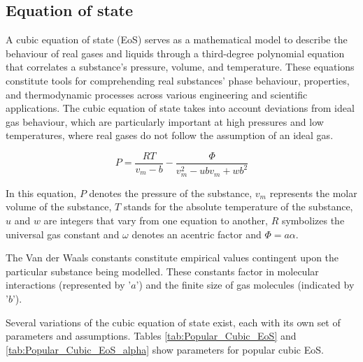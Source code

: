\documentclass[../Article_Model_Parameters.tex]{subfiles}
\begin{document}
	
	\label{CH: Thermodynamic_details}
	
	\subsection{Equation of state} \label{subsubsec: Equation of state}
	
	A cubic equation of state (EoS) serves as a mathematical model to describe the behaviour of real gases and liquids through a third-degree polynomial equation that correlates a substance's pressure, volume, and temperature. These equations constitute tools for comprehending real substances' phase behaviour, properties, and thermodynamic processes across various engineering and scientific applications. The cubic equation of state takes into account deviations from ideal gas behaviour, which are particularly important at high pressures and low temperatures, where real gases do not follow the assumption of an ideal gas.
	
	{\footnotesize
		\begin{equation}
			P = \frac{RT}{v_m-b} - \frac{\Phi}{v_m^2 - ubv_m + wb^2}
		\end{equation}
	}
	
	In this equation, $P$ denotes the pressure of the substance, $v_m$ represents the molar volume of the substance, $T$ stands for the absolute temperature of the substance, $u$ and $w$ are integers that vary from one equation to another, $R$ symbolizes the universal gas constant and $\omega$ denotes an acentric factor and $\Phi=a\alpha$.
	
	The Van der Waals constants constitute empirical values contingent upon the particular substance being modelled. These constants factor in molecular interactions (represented by '$a$') and the finite size of gas molecules (indicated by '$b$'). 
	
	Several variations of the cubic equation of state exist, each with its own set of parameters and assumptions. Tables \ref{tab:Popular_Cubic_EoS} and \ref{tab:Popular_Cubic_EoS_alpha} show parameters for popular cubic EoS.
	
	\begin{table}[h!]
		\centering
		\caption{Parameters for Popular Cubic EoS}
		\label{tab:Popular_Cubic_EoS}
	\end{table}
	
\end{document}
